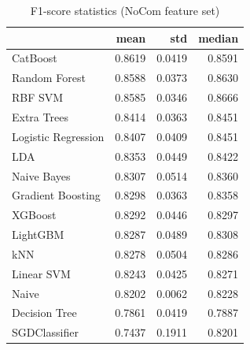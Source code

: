 \begin{table}
\caption{F1-score statistics (NoCom feature set)}
\label{tab:f1_NoCom_stats}
\begin{tabular}{lrrr}
\toprule
 & mean & std & median \\
\midrule
CatBoost & 0.8619 & 0.0419 & 0.8591 \\
Random Forest & 0.8588 & 0.0373 & 0.8630 \\
RBF SVM & 0.8585 & 0.0346 & 0.8666 \\
Extra Trees & 0.8414 & 0.0363 & 0.8451 \\
Logistic Regression & 0.8407 & 0.0409 & 0.8451 \\
LDA & 0.8353 & 0.0449 & 0.8422 \\
Naive Bayes & 0.8307 & 0.0514 & 0.8360 \\
Gradient Boosting & 0.8298 & 0.0363 & 0.8358 \\
XGBoost & 0.8292 & 0.0446 & 0.8297 \\
LightGBM & 0.8287 & 0.0489 & 0.8308 \\
kNN & 0.8278 & 0.0504 & 0.8286 \\
Linear SVM & 0.8243 & 0.0425 & 0.8271 \\
Naive & 0.8202 & 0.0062 & 0.8228 \\
Decision Tree & 0.7861 & 0.0419 & 0.7887 \\
SGDClassifier & 0.7437 & 0.1911 & 0.8201 \\
\bottomrule
\end{tabular}
\end{table}
